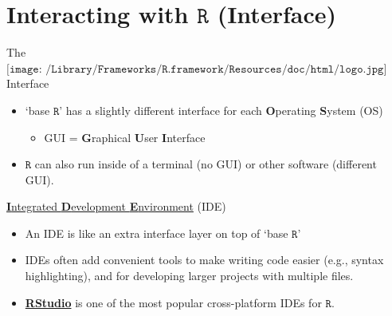 \documentclass[
  11pt,
  ignorenonframetext,
]{beamer}
\providecommand{\tightlist}{%
  \setlength{\itemsep}{0pt}\setlength{\parskip}{0pt}}
\begin{document}
\hypertarget{interacting-with-textttr-interface}{%
\section{\texorpdfstring{Interacting with \(\texttt{R}\)
(Interface)}{Interacting with \textbackslash texttt\{R\} (Interface)}}\label{interacting-with-textttr-interface}}

\begin{frame}{The
\(\texttt{[image: /Library/Frameworks/R.framework/Resources/doc/html/logo.jpg]}\)
Interface}
\protect\hypertarget{the-includegraphicsheight1emlibraryframeworksr.frameworkresourcesdochtmllogo.jpg-interface}{}
\begin{itemize}
\tightlist
\item
  `base \(\texttt{R}\)' has a slightly different interface for each
  \textbf{O}perating \textbf{S}ystem (OS)

  \begin{itemize}
  \tightlist
  \item
    GUI = \textbf{G}raphical \textbf{U}ser \textbf{I}nterface
  \end{itemize}
\item
  \(\texttt{R}\) can also run inside of a terminal (no GUI) or other
  software (different GUI).
\end{itemize}

\begin{block}{\href{https://en.wikipedia.org/wiki/Integrated_development_environment}{\textbf{I}ntegrated
\textbf{D}evelopment \textbf{E}nvironment} (IDE)}
\protect\hypertarget{integrated-development-environment-ide}{}
\begin{itemize}
\tightlist
\item
  An IDE is like an extra interface layer on top of `base
  \(\texttt{R}\)'
\item
  IDEs often add convenient tools to make writing code easier (e.g.,
  syntax highlighting), and for developing larger projects with multiple
  files.
\item
  \textbf{\href{https://posit.co/products/open-source/rstudio/}{RStudio}}
  is one of the most popular cross-platform IDEs for \(\texttt{R}\).

\end{itemize}
\end{block}
\end{frame}
\end{document}
